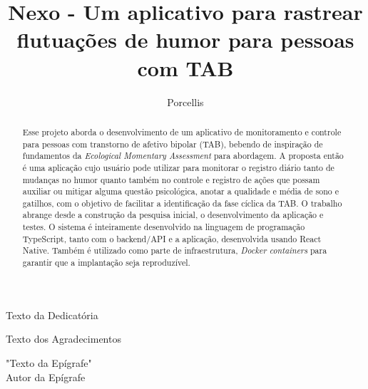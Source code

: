 \documentclass[tcc,capa,table]{textsi}
\title{Nexo - Um aplicativo para rastrear flutuações de humor para pessoas com TAB}
\author{Porcellis}{Pedro Lucas}
\begin{document}


\maketitle

\sloppy

\fichacatalografica
\folhadeaprovacao

\begin{dedicatoria}
	Texto da Dedicatória
\end{dedicatoria}

\begin{agradecimentos}
	Texto dos Agradecimentos
\end{agradecimentos}

\begin{epigrafe}
	"Texto da Epígrafe" \\
	Autor da Epígrafe
\end{epigrafe}

\begin{abstract}
\noindent
Esse projeto aborda o desenvolvimento de um aplicativo de monitoramento e
controle para pessoas com transtorno de afetivo bipolar (TAB), bebendo de
inspiração de fundamentos da \textit{Ecological Momentary Assessment} para
abordagem. A proposta então é uma aplicação cujo usuário pode utilizar para
monitorar o registro diário tanto de mudanças no humor quanto também no
controle e registro de ações que possam auxiliar ou mitigar alguma questão
psicológica, anotar a qualidade e média de sono e gatilhos, com o objetivo de
facilitar a identificação da fase cíclica da TAB. O trabalho abrange desde a
construção da pesquisa inicial, o desenvolvimento da aplicação e testes. O
sistema é inteiramente desenvolvido na linguagem de programação TypeScript,
tanto com o backend/API e a aplicação, desenvolvida usando React Native. Também
é utilizado como parte de infraestrutura, \textit{Docker containers} para
garantir que a implantação seja reproduzível.
\end{abstract}
\end{document}
